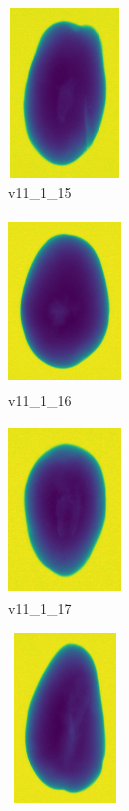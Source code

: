 \documentclass[11pt]{article}
\begin{document}
\begin{figure}
     
    \begin{subfigure}[b]{0.15\textwidth}
         \centering
         \includegraphics[width=3cm, height=4.5cm]{images/kartofler/v11_1_15_cut.png}
         \caption{v11\_1\_15}
         \label{fig:y equals x}
     \end{subfigure}
     \hfill
     \begin{subfigure}[b]{0.15\textwidth}
         \centering
         \includegraphics[width=3cm, height=4.5cm]{images/kartofler/v11_1_16_cut.png}
        \caption{v11\_1\_16}
         \label{fig:three sin x}
     \end{subfigure}
     \hfill
     \begin{subfigure}[b]{0.15\textwidth}
         \centering
         \includegraphics[width=3cm, height=4.5cm]{images/kartofler/v11_1_17_cut.png}
        \caption{v11\_1\_17}
         \label{fig:five over x}
     \end{subfigure}
     \hfill
    \begin{subfigure}[b]{0.15\textwidth}
         \centering
         \includegraphics[width=3cm, height=4.5cm]{images/kartofler/v11_1_18_cut.png}

\end{subfigure}
\end{figure}
\end{document}
